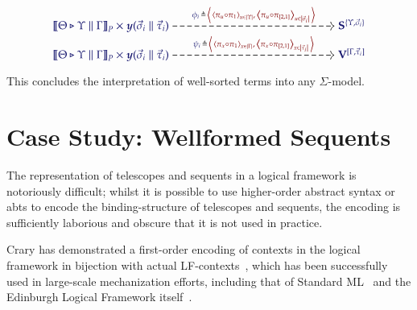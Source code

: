 \documentclass[11pt]{article}
\theoremstyle{definition}
\theoremstyle{remark}
\numberwithin{equation}{section}
\begin{document}
\begin{gather*}
  \begin{tikzcd}[cramped, ampersand replacement = \&]
    {\IMode{
      {\SemBrackets{\Theta\triangleright\Upsilon\parallel\Gamma}}_{P}
      \times
      \Yoneda{\vec{\sigma}_i\parallel\vec{\tau}_i}
    }}
      \arrow[
        , r
        , dashed
        , "
          \Define
            {
              \phi_i\,
            }
            {
              \,\Pair{
                \Tuple{\pi_u\circ\pi_1}_{u\in\Dom{\Upsilon}}
              }{
                \,\Tuple{\pi_u\circ\pi_{[2,1]}}_{u\in\Dom{\vec{\sigma}_i}}
              }
            }
          "
      ]
\&[12.0em]
    {\IMode{\SymPsh^{\{\Upsilon,\vec{\sigma}_i\}}}}
\\[-1.0em]
    {\IMode{
      {\SemBrackets{
        \Theta\triangleright\Upsilon\parallel\Gamma
      }}_{P}
      \times
      \Yoneda{\vec{\sigma}_i\parallel\vec{\tau}_i}
    }}
      \arrow[
        , r
        , dashed
        , "
          \Define{
            \psi_i\,
          }{
            \,\Pair{
              \Tuple{\pi_x\circ\pi_1}_{x\in\Dom{\Gamma}}
            }{
              \,\Tuple{\pi_x\circ\pi_{[2,1]}}_{x\in\Dom{\vec{\tau}_i}}
            }
          }
          "
      ]
\&[12.0em]
    {\IMode{\VarPsh^{[\Gamma,\vec{\tau}_i]}}}
  \end{tikzcd}
\end{gather*}

This concludes the interpretation of well-sorted terms into any $\Sigma$-model.

\section{Case Study: Wellformed Sequents}

The representation of telescopes and sequents in a logical framework is
notoriously difficult; whilst it is possible to use higher-order abstract syntax
or abts to encode the binding-structure of telescopes and sequents, the encoding
is sufficiently laborious and obscure that it is not used in practice.

Crary has demonstrated a first-order encoding of contexts in the logical
framework in bijection with actual LF-contexts~\cite{crary:2009}, which has been
successfully used in large-scale mechanization efforts, including that of
Standard ML~\cite{lee-crary-harper:2007} and the Edinburgh Logical Framework
itself~\cite{martens-crary:2012}.

\end{document}
